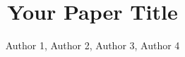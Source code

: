 \documentclass{article}
\title{Your Paper Title}
\author{Author 1, Author 2, Author 3, Author 4}
\begin{document}
\maketitle

\begin{abstract}
\end{abstract}




\end{document}
